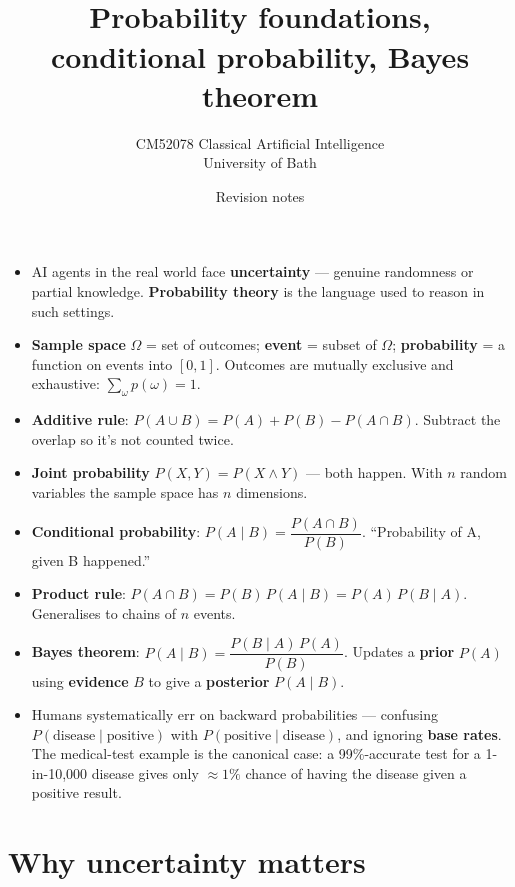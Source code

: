 \documentclass[11pt, a4paper]{article}
\title{\vspace{-1cm}{\Huge\bfseries Week 9 — Dealing with Uncertainty} \\[0.4em]{\large Probability foundations, conditional probability, Bayes theorem}}
\author{\large CM52078 Classical Artificial Intelligence \\[0.2em]\normalsize University of Bath}
\date{Revision notes}
\begin{document}
\maketitle
\thispagestyle{empty}

\vspace{1em}

\begin{tldrbox}
\begin{itemize}[leftmargin=*]
  \item AI agents in the real world face \textbf{uncertainty} — genuine randomness or partial knowledge. \textbf{Probability theory} is the language used to reason in such settings.
  \item \textbf{Sample space} $\Omega$ = set of outcomes; \textbf{event} = subset of $\Omega$; \textbf{probability} = a function on events into $[0,1]$. Outcomes are mutually exclusive and exhaustive: $\sum_\omega p(\omega) = 1$.
  \item \textbf{Additive rule}: $P(A \cup B) = P(A) + P(B) - P(A \cap B)$. Subtract the overlap so it's not counted twice.
  \item \textbf{Joint probability} $P(X, Y) = P(X \land Y)$ — both happen. With $n$ random variables the sample space has $n$ dimensions.
  \item \textbf{Conditional probability}: $P(A \mid B) = \dfrac{P(A \cap B)}{P(B)}$. ``Probability of A, given B happened.''
  \item \textbf{Product rule}: $P(A \cap B) = P(B) \, P(A \mid B) = P(A) \, P(B \mid A)$. Generalises to chains of $n$ events.
  \item \textbf{Bayes theorem}: $P(A \mid B) = \dfrac{P(B \mid A) \, P(A)}{P(B)}$. Updates a \textbf{prior} $P(A)$ using \textbf{evidence} $B$ to give a \textbf{posterior} $P(A \mid B)$.
  \item Humans systematically err on backward probabilities — confusing $P(\text{disease} \mid \text{positive})$ with $P(\text{positive} \mid \text{disease})$, and ignoring \textbf{base rates}. The medical-test example is the canonical case: a 99\%-accurate test for a 1-in-10{,}000 disease gives only $\approx 1\%$ chance of having the disease given a positive result.
\end{itemize}
\end{tldrbox}

\section{Why uncertainty matters}
\end{document}
